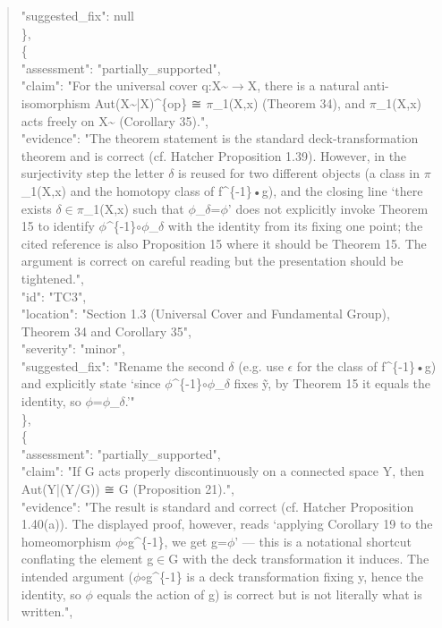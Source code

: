\documentclass[11pt]{article}
\begin{document}
\begin{quote}
      "suggested\_fix": null\\
    \},\\
    \{\\
      "assessment": "partially\_supported",\\
      "claim": "For the universal cover q:X\~{}\ensuremath{\to}X, there is a natural anti-isomorphism Aut(X\~{}|X)\^{}\{op\} ≅ \ensuremath{\pi}\_1(X,x) (Theorem 34), and \ensuremath{\pi}\_1(X,x) acts freely on X\~{} (Corollary 35).",\\
      "evidence": "The theorem statement is the standard deck-transformation theorem and is correct (cf. Hatcher Proposition 1.39). However, in the surjectivity step the letter \ensuremath{\delta} is reused for two different objects (a class in \ensuremath{\pi}\_1(X,x) and the homotopy class of f\^{}\{-1\}•g), and the closing line ‘there exists \ensuremath{\delta}\ensuremath{\in}\ensuremath{\pi}\_1(X,x) such that \ensuremath{\phi}\_\ensuremath{\delta}=\ensuremath{\phi}’ does not explicitly invoke Theorem 15 to identify \ensuremath{\phi}\^{}\{-1\}\ensuremath{\circ}\ensuremath{\phi}\_\ensuremath{\delta} with the identity from its fixing one point; the cited reference is also Proposition 15 where it should be Theorem 15. The argument is correct on careful reading but the presentation should be tightened.",\\
      "id": "TC3",\\
      "location": "Section 1.3 (Universal Cover and Fundamental Group), Theorem 34 and Corollary 35",\\
      "severity": "minor",\\
      "suggested\_fix": "Rename the second \ensuremath{\delta} (e.g. use \ensuremath{\epsilon} for the class of f\^{}\{-1\}•g) and explicitly state ‘since \ensuremath{\phi}\^{}\{-1\}\ensuremath{\circ}\ensuremath{\phi}\_\ensuremath{\delta} fixes ỹ, by Theorem 15 it equals the identity, so \ensuremath{\phi}=\ensuremath{\phi}\_\ensuremath{\delta}.’"\\
    \},\\
    \{\\
      "assessment": "partially\_supported",\\
      "claim": "If G acts properly discontinuously on a connected space Y, then Aut(Y|(Y/G)) ≅ G (Proposition 21).",\\
      "evidence": "The result is standard and correct (cf. Hatcher Proposition 1.40(a)). The displayed proof, however, reads ‘applying Corollary 19 to the homeomorphism \ensuremath{\phi}\ensuremath{\circ}g\^{}\{-1\}, we get g=\ensuremath{\phi}’ --- this is a notational shortcut conflating the element g\ensuremath{\in}G with the deck transformation it induces. The intended argument (\ensuremath{\phi}\ensuremath{\circ}g\^{}\{-1\} is a deck transformation fixing y, hence the identity, so \ensuremath{\phi} equals the action of g) is correct but is not literally what is written.",\\

\end{quote}
\end{document}
